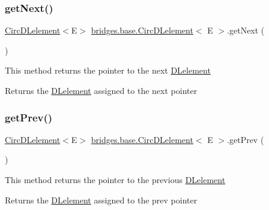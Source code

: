 \subsubsection{\texorpdfstring{get\+Next()}{getNext()}}
{\footnotesize\ttfamily \hyperlink{classbridges_1_1base_1_1_circ_d_lelement}{Circ\+D\+Lelement}$<$E$>$ \hyperlink{classbridges_1_1base_1_1_circ_d_lelement}{bridges.\+base.\+Circ\+D\+Lelement}$<$ E $>$.get\+Next (\begin{DoxyParamCaption}{ }\end{DoxyParamCaption})}

This method returns the pointer to the next \hyperlink{classbridges_1_1base_1_1_d_lelement}{D\+Lelement}

\begin{DoxyReturn}{Returns}
the \hyperlink{classbridges_1_1base_1_1_d_lelement}{D\+Lelement} assigned to the next pointer 
\end{DoxyReturn}
\hypertarget{classbridges_1_1base_1_1_circ_d_lelement_aa2b83017a571694460f77dd31b4188ed}{}\label{classbridges_1_1base_1_1_circ_d_lelement_aa2b83017a571694460f77dd31b4188ed} 
\subsubsection{\texorpdfstring{get\+Prev()}{getPrev()}}
{\footnotesize\ttfamily \hyperlink{classbridges_1_1base_1_1_circ_d_lelement}{Circ\+D\+Lelement}$<$E$>$ \hyperlink{classbridges_1_1base_1_1_circ_d_lelement}{bridges.\+base.\+Circ\+D\+Lelement}$<$ E $>$.get\+Prev (\begin{DoxyParamCaption}{ }\end{DoxyParamCaption})}

This method returns the pointer to the previous \hyperlink{classbridges_1_1base_1_1_d_lelement}{D\+Lelement}

\begin{DoxyReturn}{Returns}
the \hyperlink{classbridges_1_1base_1_1_d_lelement}{D\+Lelement} assigned to the prev pointer 
\end{DoxyReturn}
\hypertarget{classbridges_1_1base_1_1_circ_d_lelement_ae3a0c83ecc08289199344cd440f2ebe4}{}\label{classbridges_1_1base_1_1_circ_d_lelement_ae3a0c83ecc08289199344cd440f2ebe4} 
